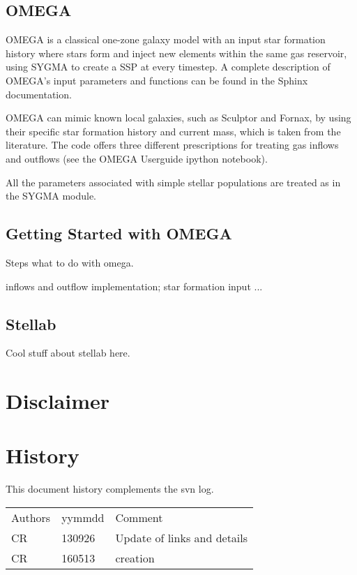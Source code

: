\subsection{OMEGA}

OMEGA is a classical one-zone galaxy model with
an input star formation history
where stars form and inject new elements within
the same gas reservoir, using SYGMA to create a SSP at every timestep.
A complete description of OMEGA's input parameters and functions can
be found in the Sphinx documentation.  

OMEGA can mimic known local galaxies, such as Sculptor and Fornax, by
using their specific star formation history and current mass, which is taken
from the literature.  The code offers three different prescriptions for treating
gas inflows and outflows (see the OMEGA Userguide ipython notebook).

All the parameters associated with simple stellar populations are treated as
in the SYGMA module.


\subsection{Getting Started with OMEGA}

Steps what to do with omega.


inflows and outflow implementation;
star formation input ...

\subsection{Stellab}

Cool stuff about stellab here.

\section{Disclaimer}

		
\section{History} 
This document history complements the svn log.

\begin{tabular*}{\textwidth}{lll}
\hline
Authors & yymmdd & Comment \\
CR & 130926 & Update of links and details \\
\hline
CR & 160513 & creation \\
\end{tabular*}


